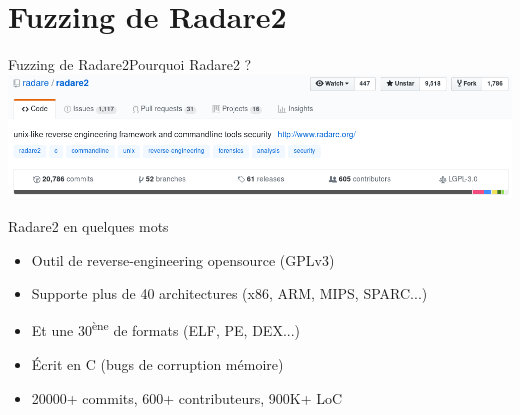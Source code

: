 \section{Fuzzing de Radare2}

\begin{frame}{Fuzzing de Radare2}{Pourquoi Radare2 ?}
  \includegraphics[width=\linewidth]{../medias/radare2-github.png}
  \begin{exampleblock}{Radare2 en quelques mots}
    \begin{itemize}
    \item{Outil de reverse-engineering opensource (GPLv3)}
    \item{Supporte plus de 40 architectures (x86, ARM, MIPS, SPARC...)}
    \item{Et une 30\textsuperscript{ène} de formats (ELF, PE, DEX...)}
    \item{Écrit en C (bugs de corruption mémoire)}
    \item{20000+ commits, 600+ contributeurs, 900K+ LoC}
    \end{itemize}
  \end{exampleblock}
\end{frame}

